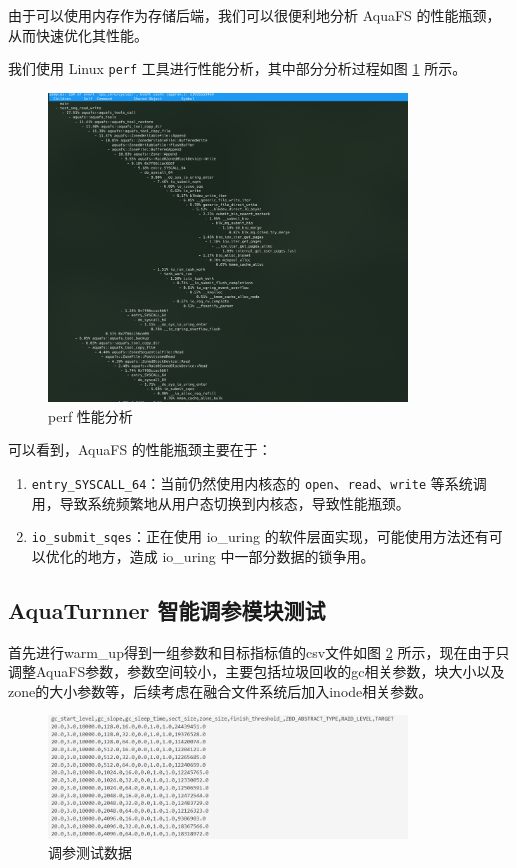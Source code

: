 由于可以使用内存作为存储后端，我们可以很便利地分析 AquaFS 的性能瓶颈，从而快速优化其性能。

我们使用 Linux \verb|perf| 工具进行性能分析，其中部分分析过程如图 \ref{test-perf} 所示。

\begin{figure}[htbp]
  \centering
  \includegraphics[width=0.85\textwidth]{fig/test-perf}
  \caption{ perf 性能分析 }
  \label{test-perf}
\end{figure}

可以看到，AquaFS 的性能瓶颈主要在于：

\begin{enumerate}
  \item \verb|entry_SYSCALL_64|：当前仍然使用内核态的 \verb|open|、\verb|read|、\verb|write| 等系统调用，导致系统频繁地从用户态切换到内核态，导致性能瓶颈。
  \item \verb|io_submit_sqes|：正在使用 io\_uring 的软件层面实现，可能使用方法还有可以优化的地方，造成 io\_uring 中一部分数据的锁争用。
\end{enumerate}

\subsection{AquaTurnner 智能调参模块测试}

首先进行warm\_up得到一组参数和目标指标值的csv文件如图 \ref{test-turnner1} 所示，现在由于只调整AquaFS参数，参数空间较小，主要包括垃圾回收的gc相关参数，块大小以及zone的大小参数等，后续考虑在融合文件系统后加入inode相关参数。

\begin{figure}[htbp]
  \centering
  \includegraphics[width=0.85\textwidth]{fig/turnner1}
  \caption{ 调参测试数据 }
  \label{test-turnner1}
\end{figure}

